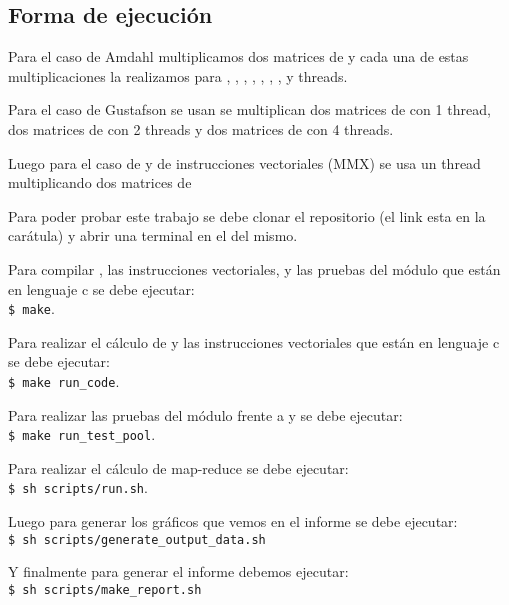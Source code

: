 \subsection{Forma de ejecución}
    Para el caso de Amdahl multiplicamos dos matrices de  y cada
    una de estas multiplicaciones la realizamos para , ,
    , , , , ,  y 
    threads.

    \hfill \break
    Para el caso de Gustafson se usan se multiplican dos matrices de
     con 1 thread, dos matrices de  con 2 threads y
    dos matrices de  con 4 threads.

    \hfill \break
    Luego para el caso de  y de instrucciones vectoriales (MMX)
    se usa un thread multiplicando dos matrices de 

    \hfill \break
    Para poder probar este trabajo se debe clonar el repositorio (el link esta
    en la carátula) y abrir una terminal en el  del mismo.

    \hfill \break
    Para compilar , las instrucciones vectoriales, y las pruebas
    del módulo  que están en lenguaje c se debe ejecutar: \\
    \lstinline[columns=fixed]{$ make}.

    \hfill \break
    Para realizar el cálculo de   y las instrucciones vectoriales
    que están en lenguaje c se debe ejecutar: \\
    \lstinline[columns=fixed]{$ make run_code}.

    \hfill \break
    Para realizar las pruebas del módulo  frente a  y
     se debe ejecutar: \\
    \lstinline[columns=fixed]{$ make run_test_pool}.

    \hfill \break
    Para realizar el cálculo de map-reduce se debe ejecutar: \\
    \lstinline[columns=fixed]{$ sh scripts/run.sh}.

    \hfill \break
    Luego para generar los gráficos que vemos en el informe se debe
    ejecutar: \\
    \lstinline[columns=fixed]{$ sh scripts/generate_output_data.sh}

    \hfill \break
    Y finalmente para generar el informe debemos ejecutar: \\
    \lstinline[columns=fixed]{$ sh scripts/make_report.sh}

